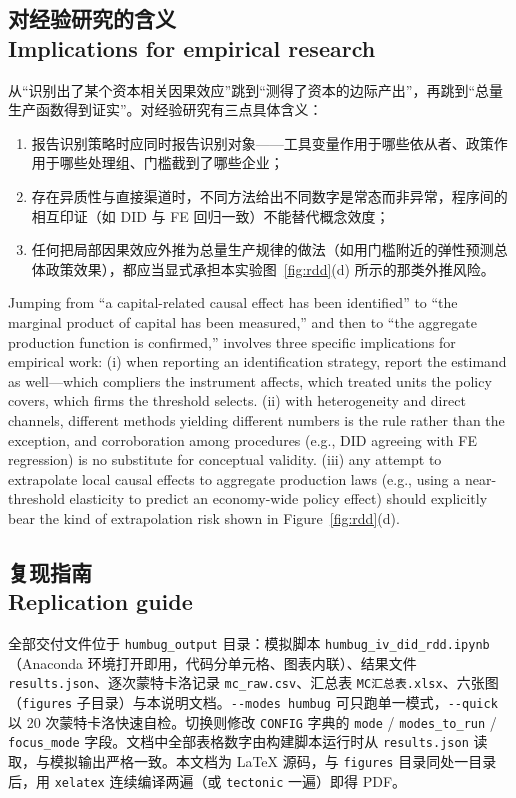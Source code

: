 \documentclass[12pt,a4paper]{ctexart}
\begin{document}
\subsection[对经验研究的含义]{对经验研究的含义\\[1pt]\normalsize Implications for empirical research}

从“识别出了某个资本相关因果效应”跳到“测得了资本的边际产出”，再跳到“总量生产函数得到证实”。对经验研究有三点具体含义：
\begin{enumerate}
  \item 报告识别策略时应同时报告识别对象——工具变量作用于哪些依从者、政策作用于哪些处理组、门槛截到了哪些企业；
  \item 存在异质性与直接渠道时，不同方法给出不同数字是常态而非异常，程序间的相互印证（如 DID 与 FE 回归一致）不能替代概念效度；
  \item 任何把局部因果效应外推为总量生产规律的做法（如用门槛附近的弹性预测总体政策效果），都应当显式承担本实验图~\ref{fig:rdd}(d) 所示的那类外推风险。
\end{enumerate}
Jumping from “a capital-related causal effect has been identified” to “the marginal product of capital has been measured,” and then to “the aggregate production function is confirmed,” involves three specific implications for empirical work: (i) when reporting an identification strategy, report the estimand as well—which compliers the instrument affects, which treated units the policy covers, which firms the threshold selects. (ii) with heterogeneity and direct channels, different methods yielding different numbers is the rule rather than the exception, and corroboration among procedures (e.g., DID agreeing with FE regression) is no substitute for conceptual validity. (iii) any attempt to extrapolate local causal effects to aggregate production laws (e.g., using a near-threshold elasticity to predict an economy-wide policy effect) should explicitly bear the kind of extrapolation risk shown in Figure~\ref{fig:rdd}(d).

\subsection[复现指南]{复现指南\\[1pt]\normalsize Replication guide}

全部交付文件位于 \texttt{humbug\_output} 目录：模拟脚本 \texttt{humbug\_iv\_did\_rdd.ipynb}（Anaconda 环境打开即用，代码分单元格、图表内联）、结果文件 \texttt{results.json}、逐次蒙特卡洛记录 \texttt{mc\_raw.csv}、汇总表 \texttt{MC汇总表.xlsx}、六张图（\texttt{figures} 子目录）与本说明文档。\texttt{-{}-modes humbug} 可只跑单一模式，\texttt{-{}-quick} 以 20 次蒙特卡洛快速自检。切换则修改 \texttt{CONFIG} 字典的 \texttt{mode} / \texttt{modes\_to\_run} / \texttt{focus\_mode} 字段。文档中全部表格数字由构建脚本运行时从 \texttt{results.json} 读取，与模拟输出严格一致。本文档为 LaTeX 源码，与 \texttt{figures} 目录同处一目录后，用 \texttt{xelatex} 连续编译两遍（或 \texttt{tectonic} 一遍）即得 PDF。
\end{document}
